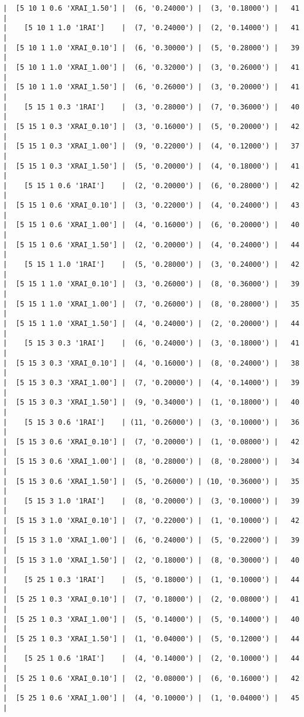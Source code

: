 \documentclass{article}
\begin{document}
\begin{verbatim}
|  [5 10 1 0.6 'XRAI_1.50'] |  (6, '0.24000') |  (3, '0.18000') |   41  |
|    [5 10 1 1.0 '1RAI']    |  (7, '0.24000') |  (2, '0.14000') |   41  |
|  [5 10 1 1.0 'XRAI_0.10'] |  (6, '0.30000') |  (5, '0.28000') |   39  |
|  [5 10 1 1.0 'XRAI_1.00'] |  (6, '0.32000') |  (3, '0.26000') |   41  |
|  [5 10 1 1.0 'XRAI_1.50'] |  (6, '0.26000') |  (3, '0.20000') |   41  |
|    [5 15 1 0.3 '1RAI']    |  (3, '0.28000') |  (7, '0.36000') |   40  |
|  [5 15 1 0.3 'XRAI_0.10'] |  (3, '0.16000') |  (5, '0.20000') |   42  |
|  [5 15 1 0.3 'XRAI_1.00'] |  (9, '0.22000') |  (4, '0.12000') |   37  |
|  [5 15 1 0.3 'XRAI_1.50'] |  (5, '0.20000') |  (4, '0.18000') |   41  |
|    [5 15 1 0.6 '1RAI']    |  (2, '0.20000') |  (6, '0.28000') |   42  |
|  [5 15 1 0.6 'XRAI_0.10'] |  (3, '0.22000') |  (4, '0.24000') |   43  |
|  [5 15 1 0.6 'XRAI_1.00'] |  (4, '0.16000') |  (6, '0.20000') |   40  |
|  [5 15 1 0.6 'XRAI_1.50'] |  (2, '0.20000') |  (4, '0.24000') |   44  |
|    [5 15 1 1.0 '1RAI']    |  (5, '0.28000') |  (3, '0.24000') |   42  |
|  [5 15 1 1.0 'XRAI_0.10'] |  (3, '0.26000') |  (8, '0.36000') |   39  |
|  [5 15 1 1.0 'XRAI_1.00'] |  (7, '0.26000') |  (8, '0.28000') |   35  |
|  [5 15 1 1.0 'XRAI_1.50'] |  (4, '0.24000') |  (2, '0.20000') |   44  |
|    [5 15 3 0.3 '1RAI']    |  (6, '0.24000') |  (3, '0.18000') |   41  |
|  [5 15 3 0.3 'XRAI_0.10'] |  (4, '0.16000') |  (8, '0.24000') |   38  |
|  [5 15 3 0.3 'XRAI_1.00'] |  (7, '0.20000') |  (4, '0.14000') |   39  |
|  [5 15 3 0.3 'XRAI_1.50'] |  (9, '0.34000') |  (1, '0.18000') |   40  |
|    [5 15 3 0.6 '1RAI']    | (11, '0.26000') |  (3, '0.10000') |   36  |
|  [5 15 3 0.6 'XRAI_0.10'] |  (7, '0.20000') |  (1, '0.08000') |   42  |
|  [5 15 3 0.6 'XRAI_1.00'] |  (8, '0.28000') |  (8, '0.28000') |   34  |
|  [5 15 3 0.6 'XRAI_1.50'] |  (5, '0.26000') | (10, '0.36000') |   35  |
|    [5 15 3 1.0 '1RAI']    |  (8, '0.20000') |  (3, '0.10000') |   39  |
|  [5 15 3 1.0 'XRAI_0.10'] |  (7, '0.22000') |  (1, '0.10000') |   42  |
|  [5 15 3 1.0 'XRAI_1.00'] |  (6, '0.24000') |  (5, '0.22000') |   39  |
|  [5 15 3 1.0 'XRAI_1.50'] |  (2, '0.18000') |  (8, '0.30000') |   40  |
|    [5 25 1 0.3 '1RAI']    |  (5, '0.18000') |  (1, '0.10000') |   44  |
|  [5 25 1 0.3 'XRAI_0.10'] |  (7, '0.18000') |  (2, '0.08000') |   41  |
|  [5 25 1 0.3 'XRAI_1.00'] |  (5, '0.14000') |  (5, '0.14000') |   40  |
|  [5 25 1 0.3 'XRAI_1.50'] |  (1, '0.04000') |  (5, '0.12000') |   44  |
|    [5 25 1 0.6 '1RAI']    |  (4, '0.14000') |  (2, '0.10000') |   44  |
|  [5 25 1 0.6 'XRAI_0.10'] |  (2, '0.08000') |  (6, '0.16000') |   42  |
|  [5 25 1 0.6 'XRAI_1.00'] |  (4, '0.10000') |  (1, '0.04000') |   45  |

\end{verbatim}
\end{document}
